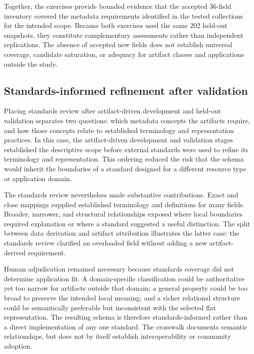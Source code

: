 \documentclass{article}
\begin{document}
Together, the exercises provide bounded evidence that the accepted 36-field inventory covered the metadata requirements identified in the tested collections for the intended scope. Because both exercises used the same 202 held-out snapshots, they constitute complementary assessments rather than independent replications. The absence of accepted new fields does not establish universal coverage, candidate saturation, or adequacy for artifact classes and applications outside the study.

\subsection{Standards-informed refinement after validation}

Placing standards review after artifact-driven development and held-out validation separates two questions: which metadata concepts the artifacts require, and how those concepts relate to established terminology and representation practices. In this case, the artifact-driven development and validation stages established the descriptive scope before external standards were used to refine its terminology and representation. This ordering reduced the risk that the schema would inherit the boundaries of a standard designed for a different resource type or application domain.

The standards review nevertheless made substantive contributions. Exact and close mappings supplied established terminology and definitions for many fields. Broader, narrower, and structural relationships exposed where local boundaries required explanation or where a standard suggested a useful distinction. The split between data derivation and artifact attribution illustrates the latter case: the standards review clarified an overloaded field without adding a new artifact-derived requirement.

Human adjudication remained necessary because standards coverage did not determine application fit. A domain-specific classification could be authoritative yet too narrow for artifacts outside that domain; a general property could be too broad to preserve the intended local meaning; and a richer relational structure could be semantically preferable but inconsistent with the selected flat representation. The resulting schema is therefore standards-informed rather than a direct implementation of any one standard. The crosswalk documents semantic relationships, but does not by itself establish interoperability or community adoption.
\end{document}
